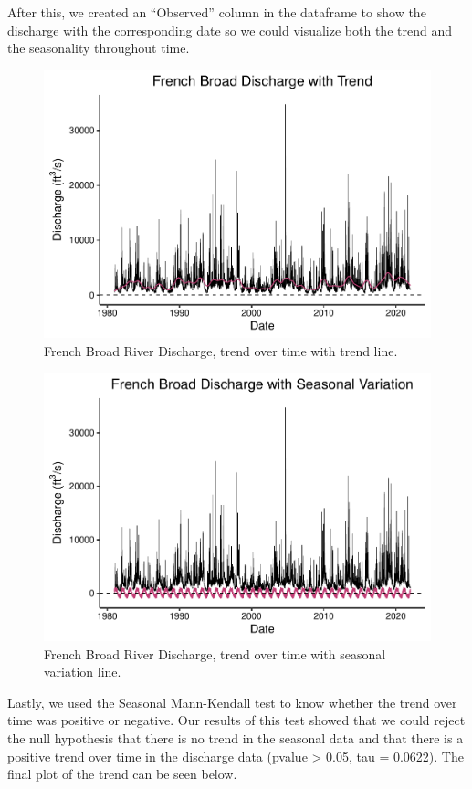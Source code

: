 \documentclass[
]{article}
\begin{document}
After this, we created an ``Observed'' column in the dataframe to show
the discharge with the corresponding date so we could visualize both the
trend and the seasonality throughout time.

\begin{figure}
\centering
\includegraphics{SD_AD_NVT_EDAfinal_files/figure-latex/unnamed-chunk-9-1.pdf}
\caption{French Broad River Discharge, trend over time with trend line.}
\end{figure}

\begin{figure}
\centering
\includegraphics{SD_AD_NVT_EDAfinal_files/figure-latex/unnamed-chunk-10-1.pdf}
\caption{French Broad River Discharge, trend over time with seasonal
variation line.}
\end{figure}

Lastly, we used the Seasonal Mann-Kendall test to know whether the trend
over time was positive or negative. Our results of this test showed that
we could reject the null hypothesis that there is no trend in the
seasonal data and that there is a positive trend over time in the
discharge data (pvalue \textgreater{} 0.05, tau = 0.0622). The final
plot of the trend can be seen below.
\end{document}
